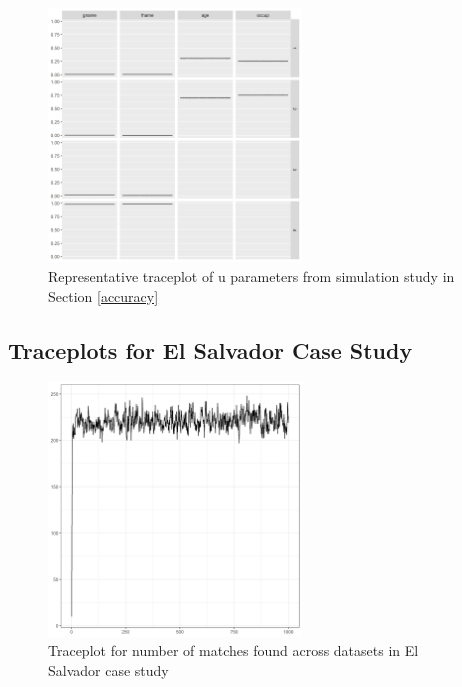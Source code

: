 \documentclass[ba]{imsart}
\begin{document}
\begin{figure}[!h]
	\begin{center}
		\includegraphics[width=0.6\textwidth]{../notes/figures/sim_u_trace} 
		\caption{Representative traceplot of u parameters from simulation study in Section \ref{accuracy}}\label{fig:sim_u_trace}
	\end{center}
\end{figure}

\clearpage

\hypertarget{appendix-es}{%
	\subsection{Traceplots for El Salvador Case Study}\label{app:appendix-es}}

\begin{figure}[!h]
\begin{center}
\includegraphics[width=0.6\textwidth]{../notes/figures/el_salvador/overlap_trace} 
\caption{Traceplot for number of matches found across datasets in El Salvador case study}\label{fig:overlap_trace}
\end{center}
\end{figure}
\end{document}
